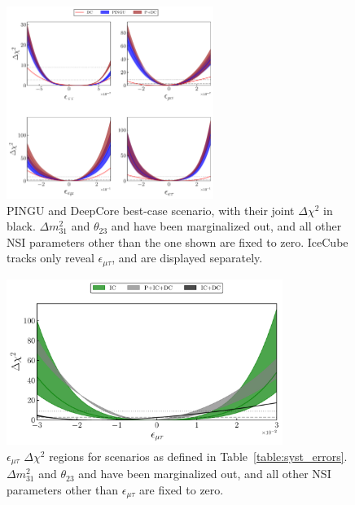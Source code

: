 \documentclass[draft=True]{revtex4-2}
\newcommand{\emt}{\ensuremath{\epsilon_{\mu\tau}}}
\newcommand{\dm}{\Delta m^2_{31}}
\begin{document}
{\begin{figure}
   \begin{center}
      \includegraphics[width=0.6\textwidth]{figures/joint_3D_NO.pdf}
      \caption{PINGU and DeepCore best-case scenario, with their joint $\Delta \chi^2$ in black. $\dm$ and $\theta_{23}$ and have been marginalized out, and all other NSI 
      parameters other than the one shown are fixed to zero. 
      IceCube tracks only reveal $\emt$, and are displayed separately.}\label{fig:3D_NO}
   \end{center}
\end{figure} 
\begin{figure}
   \begin{center} 
      \includegraphics[width=0.8\textwidth]{figures/PID_3D_emt.pdf}
      \caption{$\emt$ $\Delta \chi^2$ regions for scenarios as defined in Table~\ref{table:syst_errors}.
    $\dm$ and $\theta_{23}$ and have been marginalized out, and all other NSI 
    parameters other than $\emt$ are fixed to zero.}\label{fig:IC_3D}
   \end{center}
\end{figure}

}
\end{document}

